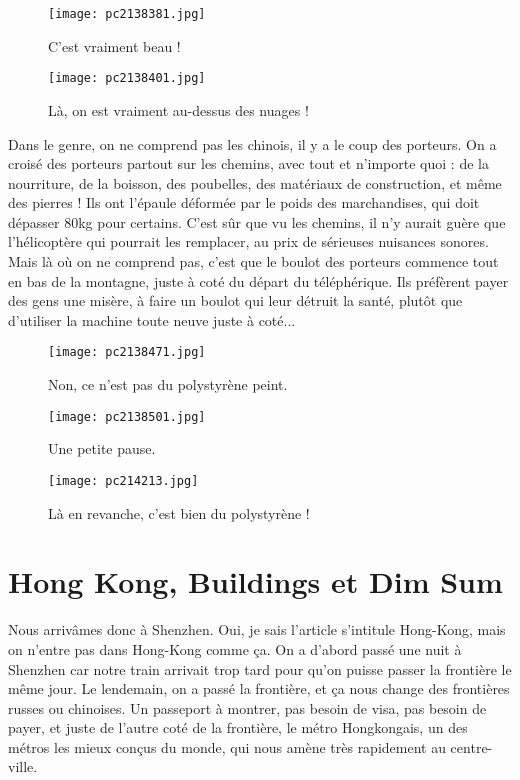 \documentclass{book}
\begin{document}
\begin{figure}[h]
\centering
\texttt{[image: pc2138381.jpg]}
\caption*{C'est vraiment beau !}
\end{figure}


\begin{figure}[h]
\centering
\texttt{[image: pc2138401.jpg]}
\caption*{Là, on est vraiment au-dessus des nuages !}
\end{figure}

Dans le genre, on ne comprend pas les chinois, il y a le coup des porteurs. On a croisé des porteurs partout sur les chemins, avec tout et n'importe quoi : de la nourriture, de la boisson, des poubelles, des matériaux de construction, et même des pierres ! Ils ont l'épaule déformée par le poids des marchandises, qui doit dépasser 80kg pour certains. C'est sûr que vu les chemins, il n'y aurait guère que l'hélicoptère qui pourrait les remplacer, au prix de sérieuses nuisances sonores. Mais là où on ne comprend pas, c'est que le boulot des porteurs commence tout en bas de la montagne, juste à coté du départ du téléphérique. Ils préfèrent payer des gens une misère, à faire un boulot qui leur détruit la santé, plutôt que d'utiliser la machine toute neuve juste à coté...


\begin{figure}[h]
\centering
\texttt{[image: pc2138471.jpg]}
\caption*{Non, ce n'est pas du polystyrène peint.}
\end{figure}


\begin{figure}[h]
\centering
\texttt{[image: pc2138501.jpg]}
\caption*{Une petite pause.}
\end{figure}


\begin{figure}[h]
\centering
\texttt{[image: pc214213.jpg]}
\caption*{Là en revanche, c'est bien du polystyrène !}
\end{figure}



\chapter{Hong Kong, Buildings et Dim Sum}


Nous arrivâmes donc à Shenzhen. Oui, je sais l'article s'intitule Hong-Kong, mais on n'entre pas dans Hong-Kong comme ça. On a d'abord passé une nuit à Shenzhen car notre train arrivait trop tard pour qu'on puisse passer la frontière le même jour. Le lendemain, on a passé la frontière, et ça nous change des frontières russes ou chinoises. Un passeport à montrer, pas besoin de visa, pas besoin de payer, et juste de l'autre coté de la frontière, le métro Hongkongais, un des métros les mieux conçus du monde, qui nous amène très rapidement au centre-ville.
\end{document}
